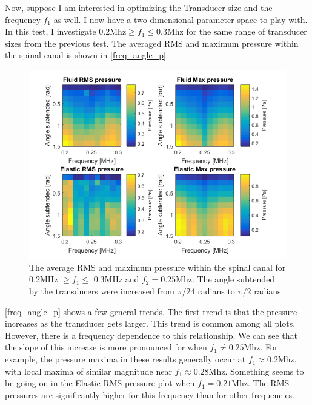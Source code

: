 \documentclass[10pt,a4paper]{article}
\begin{document}
Now, suppose I am interested in optimizing the Transducer size and the frequency $f_1$ as well. I now have a two dimensional parameter space to play with. In this test, I investigate 0.2Mhz$ \geq f_1 \leq $0.3Mhz for the same range of transducer sizes from the previous test. The averaged RMS and maximum pressure within the spinal canal is shown in \autoref{freq_angle_p}
\begin{figure}[H]
\includegraphics[scale=0.8]{freq_angle_p}
\caption{The average RMS and maximum pressure within the spinal canal for   0.2MHz $\geq f_1 \leq$ 0.3MHz and $f_2 = 0.25$Mhz. The angle subtended by the transducers were increased from $\pi/24$ radians to $\pi/2$ radians}
\label{freq_angle_p}
\end{figure}
\autoref{freq_angle_p} shows a few general trends. The first trend is that the pressure increases as the transducer gets larger. This trend is common among all plots. However, there is a frequency dependence to this relationship. We can see that the slope of this increase is more pronounced for when $f_1 \neq 0.25$Mhz. For example, the pressure maxima in these results generally occur at $f_1 \approx 0.2$Mhz, with local maxima of similar magnitude near $f_1 \approx 0.28$Mhz. Something seems to be going on in the Elastic RMS pressure plot when $f_1 = 0.21$Mhz. The RMS pressures are significantly higher for this frequency than for other frequencies. 
\end{document}
